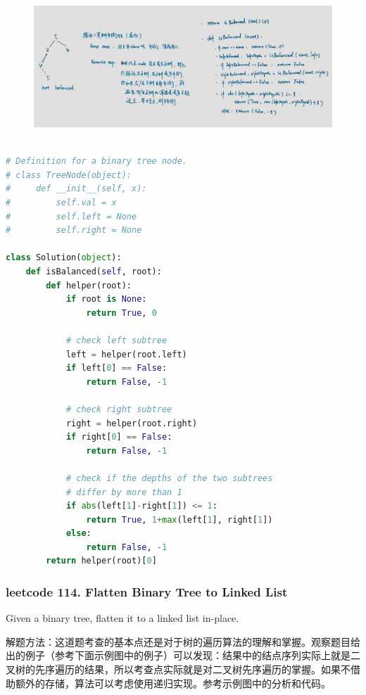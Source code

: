 \documentclass[a4paper,10pt]{article}
\begin{document}
\begin{figure}[h]
    \includegraphics[width=\textwidth]{leetcode110.jpg}
    \centering \\
\end{figure}

\begin{lstlisting}[language=Python, caption=Problem110. Balanced Binary Tree]

# Definition for a binary tree node.
# class TreeNode(object):
#     def __init__(self, x):
#         self.val = x
#         self.left = None
#         self.right = None

class Solution(object):
    def isBalanced(self, root):
        def helper(root):
            if root is None:
                return True, 0

            # check left subtree
            left = helper(root.left)
            if left[0] == False:
                return False, -1

            # check right subtree
            right = helper(root.right)
            if right[0] == False:
                return False, -1

            # check if the depths of the two subtrees
            # differ by more than 1
            if abs(left[1]-right[1]) <= 1:
                return True, 1+max(left[1], right[1])
            else:
                return False, -1
        return helper(root)[0]
\end{lstlisting}





\subsubsection{leetcode 114. Flatten Binary Tree to Linked List}
Given a binary tree, flatten it to a linked list in-place. \\

\begin{CJK*}{UTF8}{gbsn}
\noindent 解题方法：这道题考查的基本点还是对于树的遍历算法的理解和掌握。观察题目给出的例子（参考下面示例图中的例子）可以发现：结果中的结点序列实际上就是二叉树的先序遍历的结果，所以考查点实际就是对二叉树先序遍历的掌握。如果不借助额外的存储，算法可以考虑使用递归实现。参考示例图中的分析和代码。
\end{CJK*}
\end{document}
